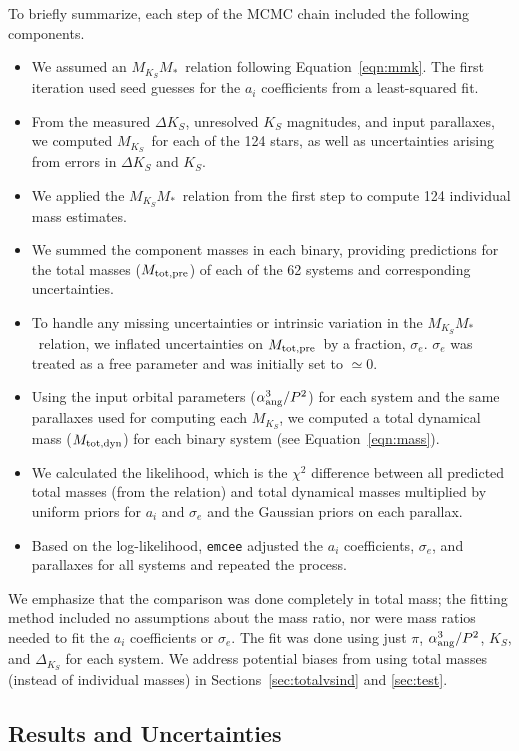 \documentclass[twocolumn]{aastex62}
\newcommand{\mks}{$M_{K_S}$}
\newcommand{\mmk}{$M_{K_S}$\textendash$M_*$}
\newcommand{\mpred}{$M_{\rm{tot,pre}}$}
\newcommand{\mdyn}{$M_{\rm{tot,dyn}}$}
\begin{document}
To briefly summarize, each step of the MCMC chain included the following components. 
\begin{itemize}
\item We assumed an \mmk\ relation following Equation~\ref{eqn:mmk}. The first iteration used seed guesses for the $a_i$ coefficients from a least-squared fit. 
\item From the measured $\Delta K_S$, unresolved $K_S$ magnitudes, and input parallaxes, we computed \mks\ for each of the 124 stars, as well as uncertainties arising from errors in $\Delta K_S$ and $K_S$.
\item We applied the \mmk\ relation from the first step to compute 124 individual mass estimates.
\item We summed the component masses in each binary, providing predictions for the total masses (\mpred) of each of the 62 systems and corresponding uncertainties.
\item To handle any missing uncertainties or intrinsic variation in the \mmk\ relation, we inflated uncertainties on \mpred\ by a fraction, $\sigma_e$. $\sigma_e$ was treated as a free parameter and was initially set to $\simeq$0. 
\item Using the input orbital parameters ($\alpha_{\rm{ang}}^3/P^2$) for each system and the same parallaxes used for computing each \mks, we computed a total dynamical mass (\mdyn) for each binary system (see Equation~\ref{eqn:mass}). 
\item We calculated the likelihood, which is the $\chi^2$ difference between all predicted total masses (from the relation) and total dynamical masses multiplied by uniform priors for $a_i$ and $\sigma_e$ and the Gaussian priors on each parallax.
\item Based on the log-likelihood, {\tt emcee} adjusted the $a_i$ coefficients, $\sigma_e$, and parallaxes for all systems and repeated the process.
\end{itemize}
We emphasize that the comparison was done completely in total mass; the fitting method included no assumptions about the mass ratio, nor were mass ratios needed to fit the $a_i$ coefficients or $\sigma_e$. The fit was done using just $\pi$, $\alpha_{\rm{ang}}^3/P^2$, $K_S$, and $\Delta_{K_S}$ for each system. We address potential biases from using total masses (instead of individual masses) in Sections~\ref{sec:totalvsind} and \ref{sec:test}. 

\subsection{Results and Uncertainties}\label{sec:res}
\end{document}
